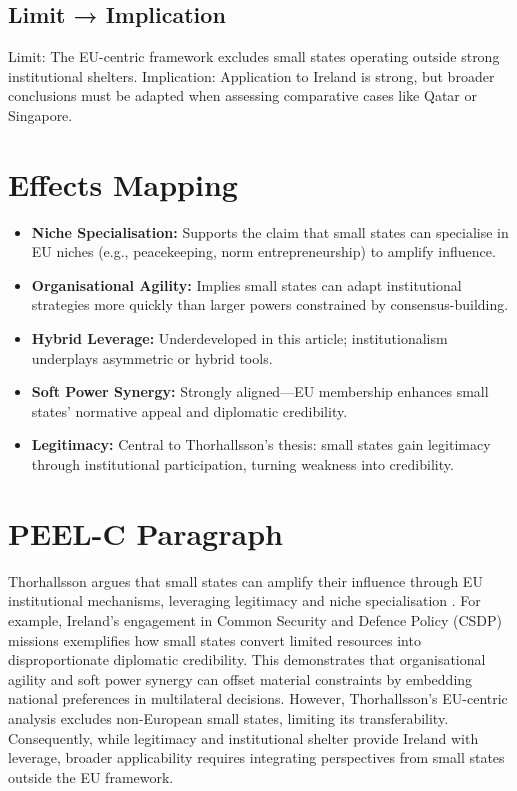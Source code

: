\subsection*{Limit → Implication}
Limit: The EU-centric framework excludes small states operating outside strong institutional shelters.  
Implication: Application to Ireland is strong, but broader conclusions must be adapted when assessing comparative cases like Qatar or Singapore.

\section*{Effects Mapping}
\begin{itemize}
	\item \textbf{Niche Specialisation:} Supports the claim that small states can specialise in EU niches (e.g., peacekeeping, norm entrepreneurship) to amplify influence.
	\item \textbf{Organisational Agility:} Implies small states can adapt institutional strategies more quickly than larger powers constrained by consensus-building.
	\item \textbf{Hybrid Leverage:} Underdeveloped in this article; institutionalism underplays asymmetric or hybrid tools.
	\item \textbf{Soft Power Synergy:} Strongly aligned—EU membership enhances small states’ normative appeal and diplomatic credibility.
	\item \textbf{Legitimacy:} Central to Thorhallsson’s thesis: small states gain legitimacy through institutional participation, turning weakness into credibility.
\end{itemize}

\section*{PEEL-C Paragraph}
Thorhallsson argues that small states can amplify their influence through EU institutional mechanisms, leveraging legitimacy and niche specialisation \parencite{}. For example, Ireland’s engagement in Common Security and Defence Policy (CSDP) missions exemplifies how small states convert limited resources into disproportionate diplomatic credibility. This demonstrates that organisational agility and soft power synergy can offset material constraints by embedding national preferences in multilateral decisions. However, Thorhallsson’s EU-centric analysis excludes non-European small states, limiting its transferability. Consequently, while legitimacy and institutional shelter provide Ireland with leverage, broader applicability requires integrating perspectives from small states outside the EU framework.

